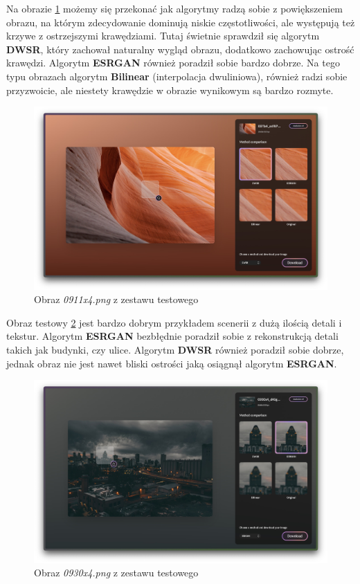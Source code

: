 Na obrazie \ref{fig:image102} możemy się przekonać jak algorytmy radzą sobie z powiększeniem obrazu, na którym zdecydowanie dominują niskie częstotliwości, ale występują też krzywe z ostrzejszymi krawędziami. Tutaj świetnie sprawdził się algorytm \textbf{DWSR}, który zachował naturalny wygląd obrazu, dodatkowo zachowując ostrość krawędzi. Algorytm \textbf{ESRGAN} również poradził sobie bardzo dobrze. Na tego typu obrazach algorytm \textbf{Bilinear} (interpolacja dwuliniowa), również radzi sobie przyzwoicie, ale niestety krawędzie w obrazie wynikowym są bardzo rozmyte.

\begin{figure}[H]
    \centering
    \includegraphics[width=0.9\linewidth]{Rozdziały/05.Porownanie_algorytmow/Obrazy/Zrzut ekranu 2023-12-12 o 14.12.47.jpg}  
    \caption{Obraz \textit{0911x4.png} z zestawu testowego \cite{guo2017deep}}
    \label{fig:image102}
\end{figure}

Obraz testowy \ref{fig:image103} jest bardzo dobrym przykładem scenerii z dużą ilością detali i tekstur. Algorytm \textbf{ESRGAN} bezbłędnie poradził sobie z rekonstrukcją detali takich jak budynki, czy ulice. Algorytm \textbf{DWSR} również poradził sobie dobrze, jednak obraz nie jest nawet bliski ostrości jaką osiągnął algorytm \textbf{ESRGAN}.

\begin{figure}[H]
    \centering
    \includegraphics[width=0.9\linewidth]{Rozdziały/05.Porownanie_algorytmow/Obrazy/Zrzut ekranu 2023-12-12 o 14.12.20.jpg}  
    \caption{Obraz \textit{0930x4.png} z zestawu testowego \cite{guo2017deep}}
    \label{fig:image103}
\end{figure}

